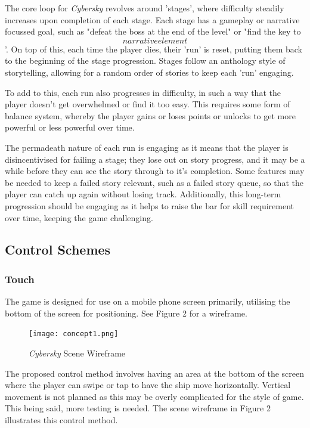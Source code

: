 \documentclass{scrartcl}
\begin{document}
The core loop for \emph{Cybersky} revolves around 'stages', where difficulty steadily increases upon completion of each stage. Each stage has a gameplay or narrative focussed goal, such as "defeat the boss at the end of the level" or "find the key to \[narrative element\]'. On top of this, each time the player dies, their 'run' is reset, putting them back to the beginning of the stage progression. Stages follow an anthology style of storytelling, allowing for a random order of stories to keep each 'run' engaging.

To add to this, each run also progresses in difficulty, in such a way that the player doesn't get overwhelmed or find it too easy. This requires some form of balance system, whereby the player gains or loses points or unlocks to get more powerful or less powerful over time.

The permadeath nature of each run is engaging as it means that the player is disincentivised for failing a stage; they lose out on story progress, and it may be a while before they can see the story through to it's completion. Some features may be needed to keep a failed story relevant, such as a failed story queue, so that the player can catch up again without losing track. Additionally, this long-term progression should be engaging as it helps to raise the bar for skill requirement over time, keeping the game challenging.

\subsection{Control Schemes}

\subsubsection{Touch}

The game is designed for use on a mobile phone screen primarily, utilising the bottom of the screen for positioning. See Figure 2 for a wireframe.

\begin{figure}[!ht]
  \centering
  \texttt{[image: concept1.png]}
  \caption[\textit{Cybersky}]{\textit{Cybersky} Scene Wireframe}
\end{figure}

The proposed control method involves having an area at the bottom of the screen where the player can swipe or tap to have the ship move horizontally. Vertical movement is not planned as this may be overly complicated for the style of game. This being said, more testing is needed. The scene wireframe in Figure 2 illustrates this control method.
\end{document}
